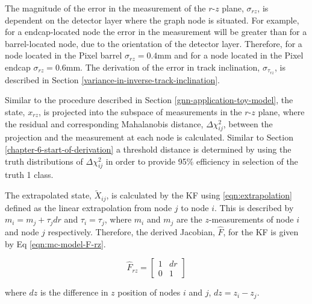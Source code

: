 The magnitude of the error in the measurement of the $r$-$z$ plane, $\sigma_{rz}$, is dependent on the detector layer where the graph node is situated. For example, for a endcap-located node the error in the measurement will be greater than for a barrel-located node, due to the orientation of the detector layer. Therefore, for a node located in the Pixel barrel $\sigma_{rz} = 0.4$mm and for a node located in the Pixel endcap $\sigma_{rz} = 0.6$mm. The derivation of the error in track inclination, $\sigma_{\tau_{rz}}$, is described in Section \ref{variance-in-inverse-track-inclination}. 

Similar to the procedure described in Section \ref{gnn-application-toy-model}, the state, $x_{rz}$, is projected into the subspace of measurements in the $r$-$z$ plane, where the residual and corresponding Mahalanobis distance, $\Delta \chi_{ij}^{2}$, between the projection and the measurement at each node is calculated. Similar to Section \ref{chapter-6-start-of-derivation} a threshold distance is determined by using the truth distributions of $\Delta \chi_{ij}^{2}$ in order to provide 95\% efficiency in selection of the truth 1 class. 




The extrapolated state, $\widetilde{X}_{ij}$, is calculated by the KF using \eqref{eqn:extrapolation} defined as the linear extrapolation from node $j$ to node $i$. This is described by $m_i = m_j + \tau_j dr$ and $\tau_i = \tau_j$, where $m_i$ and $m_j$ are the $z$-measurements of node $i$ and node $j$ respectively. Therefore, the derived Jacobian, $\hat{F}$, for the KF is given by Eq \eqref{eqn:mc-model-F-rz}.


\begin{equation}
\hat{F}_{rz} = \begin{bmatrix} 1 & dr \\ 0 & 1 \end{bmatrix}
\label{eqn:mc-model-F-rz}
\end{equation}

where $dz$ is the difference in $z$ position of nodes $i$ and $j$, $dz = z_i - z_j$.






